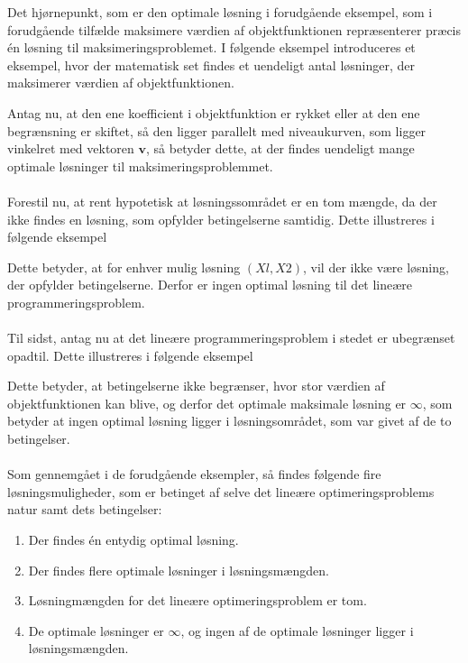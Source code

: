 \begin{eks}
Det hjørnepunkt, som er den optimale løsning i forudgående eksempel, som i forudgående tilfælde maksimere værdien
af objektfunktionen repræsenterer præcis én
løsning til maksimeringsproblemet. I følgende eksempel introduceres et eksempel, hvor der matematisk set findes et uendeligt antal løsninger, der
maksimerer værdien af objektfunktionen.
%

%
\noindent
Antag nu, at den ene koefficient i objektfunktion er rykket eller at den ene begrænsning er skiftet, så den ligger parallelt med niveaukurven, som ligger vinkelret med vektoren $\textbf{v}$, så betyder dette, at der findes uendeligt mange optimale løsninger til maksimeringsproblemmet. \\\\
%
Forestil nu, at rent hypotetisk at løsningssområdet er en tom
mængde, da der ikke findes en løsning, som opfylder betingelserne samtidig. Dette illustreres i følgende eksempel
%

%
\noindent
Dette betyder, at for enhver mulig løsning $(Xl, X2)$, vil der ikke være løsning, der opfylder betingelserne. Derfor er ingen optimal løsning til det lineære programmeringsproblem. \\\\
Til sidst, antag nu at det lineære programmeringsproblem i stedet er ubegrænset opadtil. Dette illustreres i følgende eksempel
%

%
\noindent
Dette betyder, at betingelserne ikke begrænser, hvor stor
værdien af objektfunktionen kan blive, og derfor det optimale maksimale løsning er $\infty$, som betyder at ingen optimal løsning ligger i løsningsområdet, som var givet af de to betingelser. \\\\
%
Som gennemgået i de forudgående eksempler, så findes følgende fire løsningsmuligheder, som er betinget af selve det lineære optimeringsproblems natur %
samt dets betingelser: 
\begin{enumerate}
\item Der findes én entydig optimal løsning.
\item Der findes flere optimale løsninger i løsningsmængden.
\item Løsningmængden for det lineære optimeringsproblem er tom. 
\item De optimale løsninger er $\infty$, og ingen af de optimale løsninger ligger i løsningsmængden.
\end{enumerate}
\end{eks}